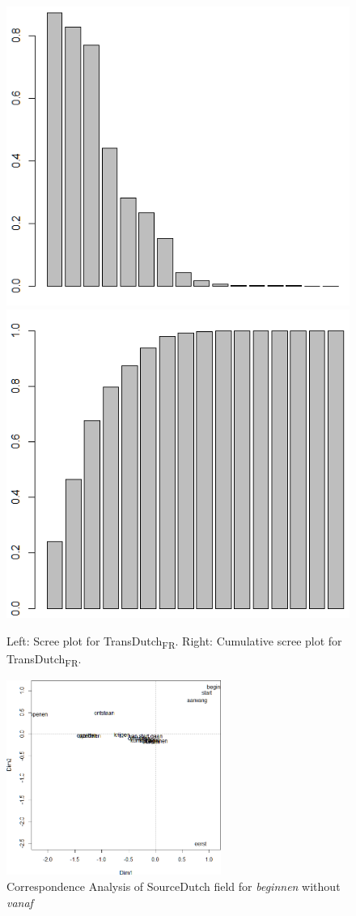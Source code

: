 \begin{figure}
\includegraphics[width=.48\textwidth]{figures/Vandevoorde2-img24.png}\hfill%
\includegraphics[width=.48\textwidth]{figures/Vandevoorde2-img25.png}
\caption{Left: \label{fig:3:24}Scree plot for TransDutch\textsubscript{FR}. Right: \label{fig:3:25}Cumulative scree plot for TransDutch\textsubscript{FR}.}
\end{figure}

\begin{figure}
\includegraphics[width=7cm]{figures/Vandevoorde2-img26.png}
\caption{\label{fig:3:26}Correspondence Analysis of SourceDutch field for \textit{beginnen} without \textit{vanaf}}
\end{figure}


